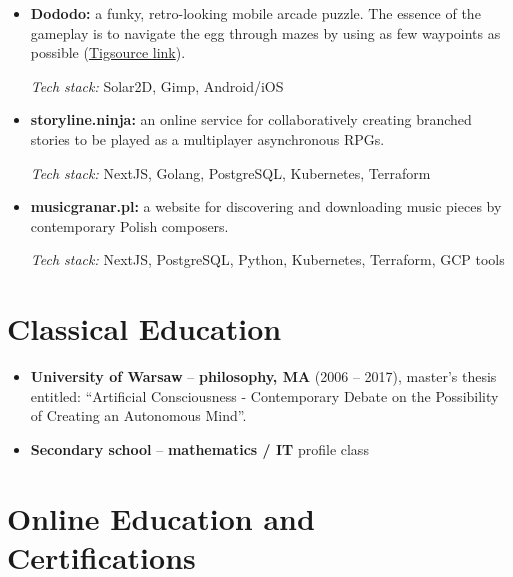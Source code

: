 \documentclass[12pt,a4paper]{article}
\begin{document}
\begin{itemize}
  \item \textbf{Dododo:} a funky, retro-looking mobile arcade puzzle. The essence of the gameplay is to navigate the egg through mazes by using as few waypoints as possible (\href{https://forums.tigsource.com/index.php?topic=67267.0}{Tigsource link}).

  \textit{Tech stack:} Solar2D, Gimp, Android/iOS

  \item \textbf{storyline.ninja:} an online service for collaboratively creating branched stories to be played as a multiplayer asynchronous RPGs.

  \textit{Tech stack:} NextJS, Golang, PostgreSQL, Kubernetes, Terraform

  \item \textbf{musicgranar.pl:} a website for discovering and downloading music pieces by contemporary Polish composers.

  \textit{Tech stack:} NextJS, PostgreSQL, Python, Kubernetes, Terraform, GCP tools
\end{itemize}

\section{Classical Education}

\begin{itemize}
  \item \textbf{University of Warsaw} -- \textbf{philosophy, MA} (2006 -- 2017), master's thesis entitled: ``Artificial Consciousness - Contemporary Debate on the Possibility of Creating an Autonomous Mind''.

  \item \textbf{Secondary school} -- \textbf{mathematics / IT} profile class
\end{itemize}

\section{Online Education and Certifications}
\end{document}
